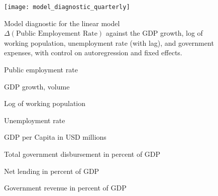 \documentclass[a4paper, 10pt]{article}
\newcommand{\insertplot}[2]{
  \begin{figure}[!ht]
    \centering
    
    \caption{#2}
  \end{figure}
}
\begin{document}
%     
\begin{landscape}

  \begin{figure}
    \centering
    \texttt{[image: model\_diagnostic\_quarterly]}
    \caption{Model diagnostic for the linear model $\Delta( \textrm{Public
        Employement Rate})$ against the GDP growth, log of working
      population, unemployment rate (with lag), and government expenses, with
      control on autoregression and fixed effects.}
   \end{figure}

  \insertplot{simple_model_quarterly_egr.tex}{Public employment rate}
  \insertplot{simple_model_quarterly_gdpv_annpct.tex}{GDP growth, volume}
  \insertplot{simple_model_quarterly_lpop_interpolated.tex}{Log of working population}
  \insertplot{simple_model_quarterly_unr.tex}{Unemployment rate}
  \insertplot{simple_model_quarterly_gdp_per_capita_interpolated.tex}{GDP per
    Capita in USD millions}
  \insertplot{simple_model_quarterly_ypgtq_interpolated.tex}{Total government disbursement in
    percent of GDP}
  \insertplot{simple_model_quarterly_nlg_to_gdp.tex}{Net lending in
    percent of GDP}
  \insertplot{simple_model_quarterly_government_revenue.tex}{Government revenue in
    percent of GDP}

\end{landscape}
\end{document}
